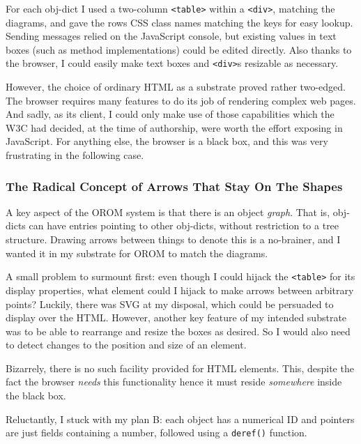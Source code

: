 For each obj-dict I used a two-column
\texttt{\textless{}table\textgreater{}} within a
\texttt{\textless{}div\textgreater{}}, matching the diagrams, and gave
the rows CSS class names matching the keys for easy lookup. Sending
messages relied on the JavaScript console, but existing values in text
boxes (such as method implementations) could be edited directly. Also
thanks to the browser, I could easily make text boxes and
\texttt{\textless{}div\textgreater{}}s resizable as necessary.

However, the choice of ordinary HTML as a substrate proved rather
two-edged. The browser requires many features to do its job of rendering
complex web pages. And sadly, as its client, I could only make use of
those capabilities which the W3C had decided, at the time of authorship,
were worth the effort exposing in JavaScript. For anything else, the
browser is a black box, and this was very frustrating in the following
case.

\hypertarget{the-radical-concept-of-arrows-that-stay-on-the-shapes}{%
\subsubsection{The Radical Concept of Arrows That Stay On The
Shapes}\label{the-radical-concept-of-arrows-that-stay-on-the-shapes}}

A key aspect of the OROM system is that there is an object \emph{graph}.
That is, obj-dicts can have entries pointing to other obj-dicts, without
restriction to a tree structure. Drawing arrows between things to denote
this is a no-brainer, and I wanted it in my substrate for OROM to match
the diagrams.

A small problem to surmount first: even though I could hijack the
\texttt{\textless{}table\textgreater{}} for its display properties, what
element could I hijack to make arrows between arbitrary points? Luckily,
there was SVG at my disposal, which could be persuaded to display over
the HTML. However, another key feature of my intended substrate was to
be able to rearrange and resize the boxes as desired. So I would also
need to detect changes to the position and size of an element.

Bizarrely, there is no such facility provided for HTML elements. This,
despite the fact the browser \emph{needs} this functionality hence it
must reside \emph{somewhere} inside the black box.

Reluctantly, I stuck with my plan B: each object has a numerical ID and
pointers are just fields containing a number, followed using a
\texttt{deref()} function.

